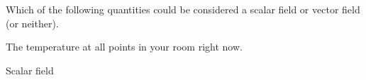 Which of the following quantities could be considered a scalar field or vector field (or neither).

The temperature at all points in your room right now.

\begin{solution}
    Scalar field
\end{solution}